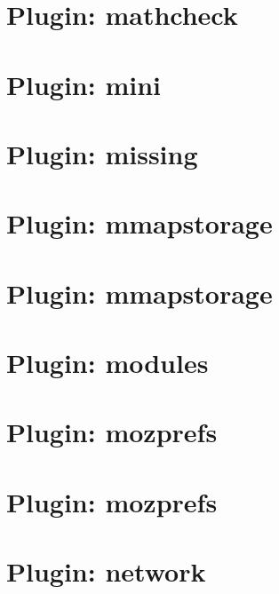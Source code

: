 \let\mypdfximage\pdfximage\def\pdfximage{\immediate\mypdfximage}\documentclass[twoside]{book}
\newcommand{\+}{\discretionary{\mbox{\scriptsize$\hookleftarrow$}}{}{}}
\begin{document}
\chapter{Plugin\+: mathcheck}
\label{md_src_plugins_mathcheck_README}

\chapter{Plugin\+: mini}
\label{md_src_plugins_mini_README}

\chapter{Plugin\+: missing}
\label{md_src_plugins_missing_README}

\chapter{Plugin\+: mmapstorage}
\label{md_src_plugins_mmapstorage_README}

\chapter{Plugin\+: mmapstorage}
\label{md_src_plugins_mmapstorage_shelltests}

\chapter{Plugin\+: modules}
\label{md_src_plugins_modules_README}

\chapter{Plugin\+: mozprefs}
\label{md_src_plugins_mozprefs_autoconfig_README}

\chapter{Plugin\+: mozprefs}
\label{md_src_plugins_mozprefs_README}

\chapter{Plugin\+: network}
\label{md_src_plugins_network_README}

\end{document}
